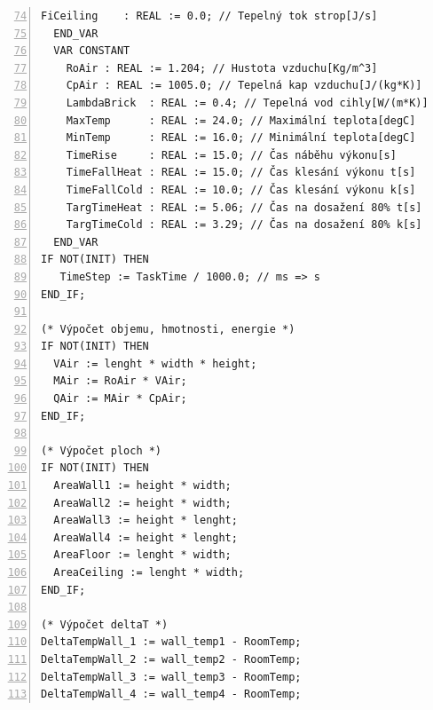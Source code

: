 \begin{lstlisting}[language=ST, breaklines=true, numbers=left, firstnumber=74, numberstyle=\small, numbersep=10pt, frame=single, basicstyle=\ttfamily\small]
    FiCeiling    : REAL := 0.0; // Tepelný tok strop[J/s]
  END_VAR
  VAR CONSTANT
    RoAir : REAL := 1.204; // Hustota vzduchu[Kg/m^3]
    CpAir : REAL := 1005.0; // Tepelná kap vzduchu[J/(kg*K)]
    LambdaBrick  : REAL := 0.4; // Tepelná vod cihly[W/(m*K)]
    MaxTemp      : REAL := 24.0; // Maximální teplota[degC]
    MinTemp      : REAL := 16.0; // Minimální teplota[degC]
    TimeRise     : REAL := 15.0; // Čas náběhu výkonu[s]
    TimeFallHeat : REAL := 15.0; // Čas klesání výkonu t[s]
    TimeFallCold : REAL := 10.0; // Čas klesání výkonu k[s]
    TargTimeHeat : REAL := 5.06; // Čas na dosažení 80% t[s]
    TargTimeCold : REAL := 3.29; // Čas na dosažení 80% k[s]
  END_VAR
IF NOT(INIT) THEN
   TimeStep := TaskTime / 1000.0; // ms => s
END_IF;

(* Výpočet objemu, hmotnosti, energie *)
IF NOT(INIT) THEN
  VAir := lenght * width * height;
  MAir := RoAir * VAir;
  QAir := MAir * CpAir;
END_IF;

(* Výpočet ploch *)
IF NOT(INIT) THEN
  AreaWall1 := height * width;
  AreaWall2 := height * width;
  AreaWall3 := height * lenght;
  AreaWall4 := height * lenght;
  AreaFloor := lenght * width;
  AreaCeiling := lenght * width;
END_IF;

(* Výpočet deltaT *)
DeltaTempWall_1 := wall_temp1 - RoomTemp;
DeltaTempWall_2 := wall_temp2 - RoomTemp;
DeltaTempWall_3 := wall_temp3 - RoomTemp;
DeltaTempWall_4 := wall_temp4 - RoomTemp;
\end{lstlisting}
\pagebreak
